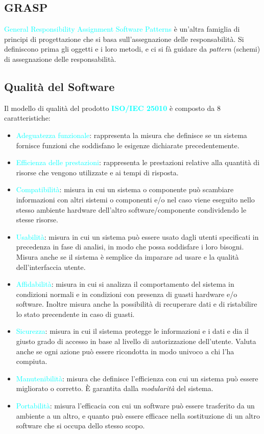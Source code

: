 \subsection{GRASP}

\textcolor{cyan}{General Responsibility Assignment Software Patterns} è un'altra famiglia di
principi di progettazione che si basa sull'assegnazione delle responsabilità. Si definiscono prima gli oggetti e i loro metodi,
e ci si fà guidare da \emph{pattern} (schemi) di assegnazione delle responsabilità.

\subsection{Qualità del Software}

Il modello di qualità del prodotto \textbf{\textcolor{cyan}{ISO/IEC 25010}} è composto da 8 caratteristiche:
\begin{itemize}
    \item \textcolor{cyan}{Adeguatezza funzionale}: rappresenta la misura che definisce se un sistema
        fornisce funzioni che soddisfano le esigenze dichiarate precedentemente.
    \item \textcolor{cyan}{Efficienza delle prestazioni}: rappresenta le prestazioni relative alla quantità di risorse che
        vengono utilizzate e ai tempi di risposta.
    \item \textcolor{cyan}{Compatibilità}: misura in cui un sistema o componente può scambiare informazioni
        con altri sistemi o componenti e/o nel caso viene eseguito nello stesso ambiente hardware dell'altro software/componente condividendo le stesse risorse.
    \item \textcolor{cyan}{Usabilità}: misura in cui un sistema può essere usato dagli utenti specificati in precedenza in fase di analisi, in modo che possa soddisfare i loro bisogni. Misura anche se il sistema è
        semplice da imparare ad usare e la qualità dell'interfaccia utente.
    \item \textcolor{cyan}{Affidabilità}: misura in cui si analizza il comportamento del sistema in condizioni normali e in condizioni
        con presenza di guasti hardware e/o software. Inoltre misura anche la possibilità di recuperare dati e di ristabilire lo stato precendente in caso di guasti.
    \item \textcolor{cyan}{Sicurezza}: misura in cui il sistema protegge le informazioni e i dati e dia il giusto grado di accesso in base al livello di autorizzazione
        dell'utente. Valuta anche se ogni azione può essere ricondotta in modo univoco a chi l'ha compiuta.
    \item \textcolor{cyan}{Manutenibilità}: misura che definisce l'efficienza con cui un sistema può essere migliorato o corretto.
        È garantita dalla \emph{modularità} del sistema.
    \item \textcolor{cyan}{Portabilità}: misura l'efficacia con cui un software può essere trasferito da un ambiente a un altro, e quanto
        può essere efficace nella sostituzione di un altro software che si occupa dello stesso scopo.
\end{itemize}

